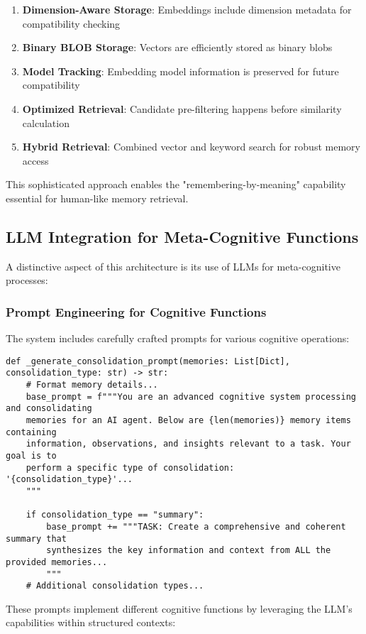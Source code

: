 \documentclass[12pt,a4paper]{article}
\begin{document}
\begin{enumerate}[label=\arabic*.]
    \item \textbf{Dimension-Aware Storage}: Embeddings include dimension metadata for compatibility checking
    \item \textbf{Binary BLOB Storage}: Vectors are efficiently stored as binary blobs
    \item \textbf{Model Tracking}: Embedding model information is preserved for future compatibility
    \item \textbf{Optimized Retrieval}: Candidate pre-filtering happens before similarity calculation
    \item \textbf{Hybrid Retrieval}: Combined vector and keyword search for robust memory access
\end{enumerate}

This sophisticated approach enables the "remembering-by-meaning" capability essential for human-like memory retrieval.

\subsection*{LLM Integration for Meta-Cognitive Functions}

A distinctive aspect of this architecture is its use of LLMs for meta-cognitive processes:

\subsubsection*{Prompt Engineering for Cognitive Functions}

The system includes carefully crafted prompts for various cognitive operations:
\begin{pageablecode}
\begin{verbatim}
def _generate_consolidation_prompt(memories: List[Dict], consolidation_type: str) -> str:
    # Format memory details...
    base_prompt = f"""You are an advanced cognitive system processing and consolidating
    memories for an AI agent. Below are {len(memories)} memory items containing
    information, observations, and insights relevant to a task. Your goal is to
    perform a specific type of consolidation: '{consolidation_type}'...
    """

    if consolidation_type == "summary":
        base_prompt += """TASK: Create a comprehensive and coherent summary that
        synthesizes the key information and context from ALL the provided memories...
        """
    # Additional consolidation types...
\end{verbatim}
\end{pageablecode}
These prompts implement different cognitive functions by leveraging the LLM's capabilities within structured contexts:
\end{document}

